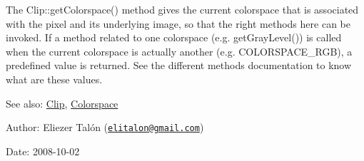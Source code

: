 The Clip::getColorspace() method gives the current colorspace that is associated with the pixel and its underlying image, so that the right methods here can be invoked. If a method related to one colorspace (e.g. getGrayLevel()) is called when the current colorspace is actually another (e.g. COLORSPACE\_\-RGB), a predefined value is returned. See the different methods documentation to know what are these values.

\begin{Desc}
\item[See also:]\hyperlink{class_clip}{Clip}, \hyperlink{_colorspace_8h_7a7e24cdb2a27271343f0adceff89f65}{Colorspace}\end{Desc}
\begin{Desc}
\item[Author:]Eliezer Talón (\href{mailto:elitalon@gmail.com}{\tt elitalon@gmail.com}) \end{Desc}
\begin{Desc}
\item[Date:]2008-10-02 \end{Desc}


